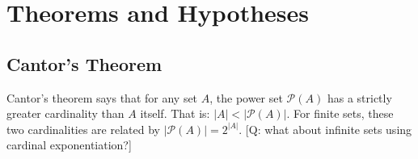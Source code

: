 




\section{Theorems and Hypotheses}

\subsection{Cantor's Theorem}
Cantor's theorem says that for any set $A$, the power set $\mathcal{P}(A)$ has a strictly greater cardinality than $A$ itself. That is: $|A| < |\mathcal{P}(A)|$. For finite sets, these two cardinalities are related by $|\mathcal{P}(A)| = 2^{|A|}$. [Q: what about infinite sets using cardinal exponentiation?]



